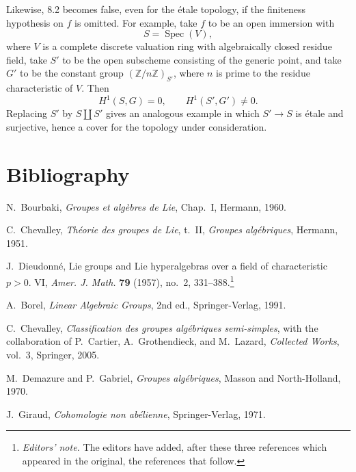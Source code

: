 Likewise, 8.2 becomes false, even for the étale topology, if the
finiteness hypothesis on \(f\) is omitted. For example, take \(f\)
to be an open immersion with
\[
  S=\operatorname{Spec}(V),
\]
where \(V\) is a complete discrete valuation ring with algebraically
closed residue field, take \(S'\) to be the open subscheme consisting
of the generic point, and take \(G'\) to be the constant group
\((\mathbb Z/n\mathbb Z)_{S'}\), where \(n\) is prime to the residue
characteristic of \(V\). Then
\[
  H^1(S,G)=0,
  \qquad
  H^1(S',G')\neq0.
\]
Replacing \(S'\) by \(S\amalg S'\) gives an analogous example in which
\(S'\to S\) is étale and surjective, hence a cover for the topology
under consideration.

\section*{Bibliography}

\noindent[BLie]\enspace
N.~Bourbaki, \textit{Groupes et algèbres de Lie}, Chap.~I, Hermann,
1960.\par

\smallskip\noindent[Ch51]\enspace
C.~Chevalley, \textit{Théorie des groupes de Lie}, t.~II,
\textit{Groupes algébriques}, Hermann, 1951.\par

\smallskip\noindent[Di57]\enspace
J.~Dieudonné, Lie groups and Lie hyperalgebras over a field of
characteristic \(p>0\). VI, \textit{Amer. J. Math.} \textbf{79}
(1957), no.~2, 331--388.\footnote{\textit{Editors' note.} The editors
have added, after these three references which appeared in the
original, the references that follow.}\par

\smallskip\noindent[Bo91]\enspace
A.~Borel, \textit{Linear Algebraic Groups}, 2nd ed.,
Springer-Verlag, 1991.\par

\smallskip\noindent[Ch05]\enspace
C.~Chevalley, \textit{Classification des groupes algébriques
semi-simples}, with the collaboration of P.~Cartier,
A.~Grothendieck, and M.~Lazard, \textit{Collected Works}, vol.~3,
Springer, 2005.\par

\smallskip\noindent[DG70]\enspace
M.~Demazure and P.~Gabriel, \textit{Groupes algébriques}, Masson and
North-Holland, 1970.\par

\smallskip\noindent[Gi71]\enspace
J.~Giraud, \textit{Cohomologie non abélienne}, Springer-Verlag,
1971.\par

